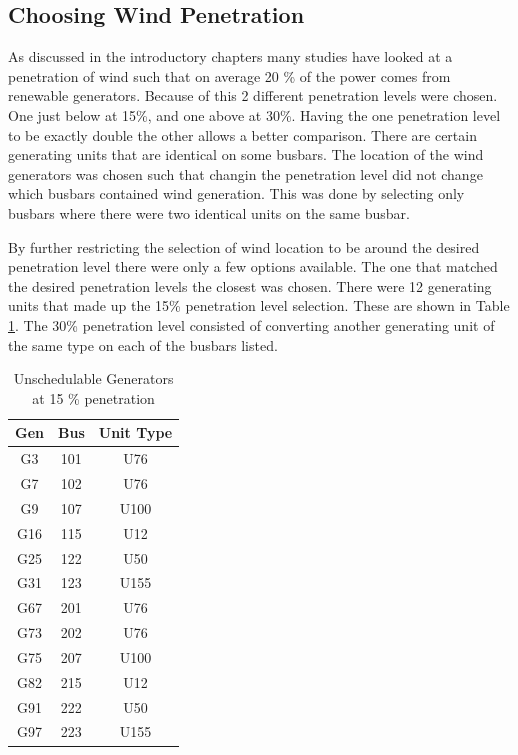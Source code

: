 \documentclass[a4paper,oneside,12pt]{report}
\begin{document}
\subsection{Choosing Wind Penetration}

As discussed in the introductory chapters many studies have looked at a penetration of wind such that on average 20 \% of the power comes from renewable generators. Because of this 2 different penetration levels were chosen. One just below at 15\%, and one above at 30\%. Having the one penetration level to be exactly double the other allows a better comparison. There are certain generating units that are identical on some busbars. The location of the wind generators was chosen such that changin the penetration level did not change which busbars contained wind generation. This was done by selecting only busbars where there were two identical units on the same busbar. 

By further restricting the selection of wind location to be around the desired penetration level there were only a few options available. The one that matched the desired penetration levels the closest was chosen. There were 12 generating units that made up the 15\% penetration level selection. These are shown in Table \ref{table_unsch_generators}. The 30\% penetration level consisted of converting another generating unit of the same type on each of the busbars listed.

\begin{table}[htbp]
\caption{Unschedulable Generators at 15 \% penetration}
\label{table_unsch_generators}
\centering
\begin{tabular}{c||c||c}
\bfseries Gen & \bfseries Bus & \bfseries Unit Type \\
\hline \hline
G3  & 101& U76 \\
G7  & 102 & U76 \\
G9  & 107 & U100 \\
G16 & 115 & U12 \\
G25 & 122 & U50 \\
G31 & 123 & U155 \\
\hline
G67 & 201& U76 \\
G73 & 202 & U76 \\
G75 & 207 & U100 \\
G82 & 215 & U12 \\
G91 & 222 & U50 \\
G97 & 223 & U155 \\
\hline
\end{tabular}
\end{table}
\end{document}
